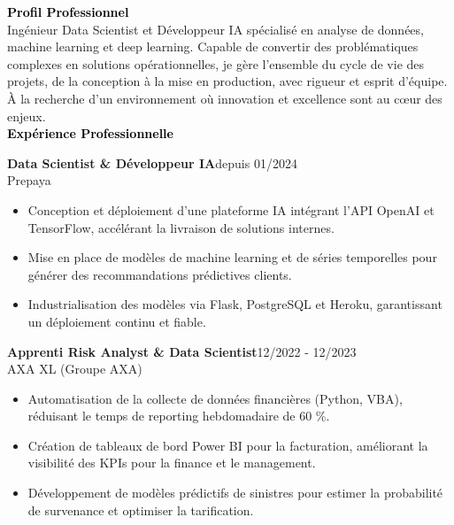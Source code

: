 \documentclass{article}
\begin{document}
\begin{paracol}{2}
\textcolor{black}{\Large \textbf{Profil Professionnel}} \\[2pt]
Ingénieur Data Scientist et Développeur IA spécialisé en analyse de données, machine learning et deep learning. Capable de convertir des problématiques complexes en solutions opérationnelles, je gère l’ensemble du cycle de vie des projets, de la conception à la mise en production, avec rigueur et esprit d’équipe. À la recherche d’un environnement où innovation et excellence sont au cœur des enjeux. \\[8pt]

\textcolor{black}{\Large \textbf{Expérience Professionnelle}} \\[2pt]
\colorbox{maincolor}{%
  \begin{minipage}{\linewidth}
    \noindent
    \textbf{Data Scientist \& Développeur IA}\hfill depuis 01/2024\\
    Prepaya\\[-0.3em]
    \begin{itemize}[leftmargin=*]
      \item Conception et déploiement d’une plateforme IA intégrant l’API OpenAI et TensorFlow, accélérant la livraison de solutions internes. \item Mise en place de modèles de machine learning et de séries temporelles pour générer des recommandations prédictives clients. \item Industrialisation des modèles via Flask, PostgreSQL et Heroku, garantissant un déploiement continu et fiable.
    \end{itemize}
  \end{minipage}}

\vspace{3mm}

\colorbox{maincolor}{%
  \begin{minipage}{\linewidth}
    \noindent
    \textbf{Apprenti Risk Analyst \& Data Scientist}\hfill 12/2022 - 12/2023\\
    AXA XL (Groupe AXA)\\[-0.3em]
    \begin{itemize}[leftmargin=*]
      \item Automatisation de la collecte de données financières (Python, VBA), réduisant le temps de reporting hebdomadaire de 60 \%. \item Création de tableaux de bord Power BI pour la facturation, améliorant la visibilité des KPIs pour la finance et le management. \item Développement de modèles prédictifs de sinistres pour estimer la probabilité de survenance et optimiser la tarification.
    \end{itemize}
  \end{minipage}}


\end{paracol}
\end{document}
